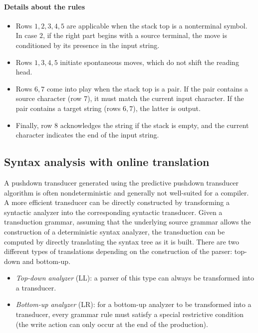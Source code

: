 \paragraph*{Details about the rules}
\begin{itemize}
    \item Rows $1, 2, 3, 4, 5$ are applicable when the stack top is a nonterminal symbol.
        In case $2$, if the right part begins with a source terminal, the move is conditioned by its presence in the input string.
    \item Rows $1, 3, 4, 5$ initiate spontaneous moves, which do not shift the reading head.
    \item Rows $6, 7$ come into play when the stack top is a pair.
        If the pair contains a source character (row $7$), it must match the current input character.
        If the pair contains a target string (rows $6, 7$), the latter is output.
    \item Finally, row $8$ acknowledges the string if the stack is empty, and the current character indicates the end of the input string.
\end{itemize}

\subsection{Syntax analysis with online translation}
A pushdown transducer generated using the predictive pushdown transducer algorithm is often nondeterministic and generally not well-suited for a compiler. 
A more efficient transducer can be directly constructed by transforming a syntactic analyzer into the corresponding syntactic transducer. 
Given a transduction grammar, assuming that the underlying source grammar allows the construction of a deterministic syntax analyzer, the transduction can be computed by directly translating the syntax tree as it is built.
There are two different types of translations depending on the construction of the parser: top-down and bottom-up.
\begin{itemize}
    \item \textit{Top-down analyzer} (LL): a parser of this type can always be transformed into a transducer.
    \item \textit{Bottom-up analyzer} (LR): for a bottom-up analyzer to be transformed into a transducer, every grammar rule must satisfy a special restrictive condition (the write action can only occur at the end of the production).
\end{itemize}

